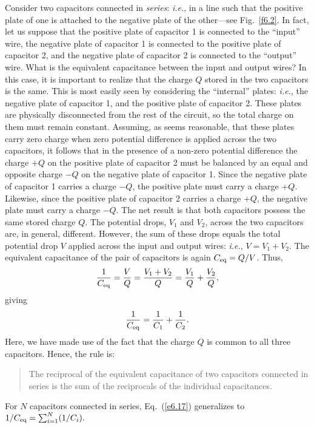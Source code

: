 Consider two capacitors connected in {\em series}: {\em i.e.}, in a line such that
the positive plate of one is attached to the negative plate of the other---see
Fig.~\ref{f6.2}.
In fact, let us suppose that the positive plate of capacitor 1 is connected
to the ``input'' wire, the negative plate of capacitor 1 is connected to
the positive plate of capacitor 2, and the negative plate of capacitor
2 is connected to the ``output'' wire. 
What is the equivalent capacitance  between the input and output wires? 
In this case, it is important to realize that the charge $Q$ stored in
the two capacitors is the same. This is most easily seen by considering
the ``internal'' plates: {\em i.e.}, the negative plate of capacitor 1, and
the positive plate of capacitor 2. These plates are physically disconnected
from the rest of the circuit, so the total charge on them must
remain constant. Assuming, as seems reasonable, that these plates carry zero charge
when zero potential difference is applied across the two capacitors, it follows
that in the presence of a non-zero potential difference the charge $+Q$ on the positive
plate of capacitor 2 must be balanced by an equal and opposite charge
$-Q$ on the negative plate of capacitor 1. Since the negative plate of
capacitor 1 carries a charge $-Q$, the positive plate must carry a charge $+Q$.
Likewise, since the positive plate of capacitor 2 carries a charge $+Q$, the
negative plate must carry a charge $-Q$. The net result is that both capacitors
possess the same stored charge $Q$. The potential drops, $V_1$ and $V_2$, across
the two capacitors are, in general, different. However, the sum of these
drops equals the total potential drop $V$ applied across the input and output
wires: {\em i.e.}, $V=V_1+V_2$. The equivalent capacitance of the pair of
capacitors is again $C_{\rm eq} = Q/V$. 
Thus,
\begin{equation}
\frac{1}{C_{\rm eq}}=\frac{V}{Q}=\frac{V_1+ V_2}{Q} = \frac{V_1}{Q} + \frac{V_2}{Q},
\end{equation}
giving
\begin{equation}\label{e6.17}
\frac{1}{C_{\rm eq}} = \frac{1}{C_1} + \frac{1}{C_2}.
\end{equation}
Here, we have made use of the fact that the charge $Q$ is common to all three
capacitors.
Hence, the rule is:
\begin{quote}
{\sf The reciprocal of the equivalent capacitance of two capacitors connected in
series is the sum of the reciprocals of the individual capacitances.}
\end{quote}
For $N$ capacitors connected in series, Eq.~(\ref{e6.17}) generalizes to $1/C_{\rm eq}
=\sum_{i=1}^N (1/C_i).$

